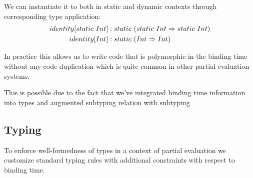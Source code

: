 We can instantiate it to both in static and dynamic contexts through corresponding
type application:
\begin{align}\nonumber
  identity[static\ Int] &: static\ (static\ Int \Rightarrow static\ Int) \\
  identity[Int]          &: static\ (Int \Rightarrow Int)
\end{align}

In practice this allows us to write code that is polymorphic in the binding time without
any code duplication which is quite common in other partial evaluation systems.

This is possible due to the fact that we've integrated binding time information into types
and augmented subtyping relation with subtyping

\subsection{Typing}

To enforce well-formedness of types in a context of partial evaluation we customize
standard typing rules with additional constraints with respect to binding time.

